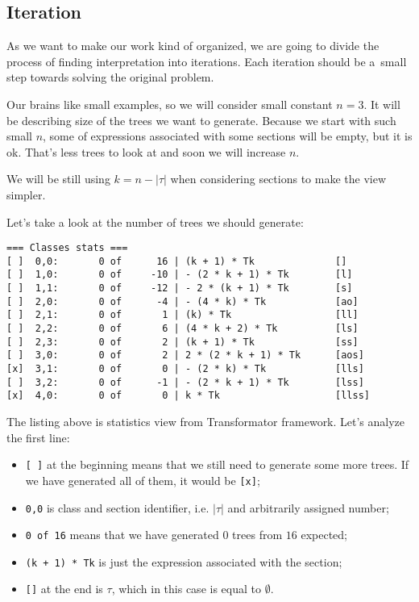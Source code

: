 \documentclass[final]{article}
\theoremstyle{definition}
\theoremstyle{definition}
\theoremstyle{remark}
\begin{document}
\subsection{Iteration}%
\label{sub:iteration}

As we want to make our work kind of organized, we are going to divide the process of finding interpretation into iterations. Each iteration should be a~small step towards solving the original problem.

Our brains like small examples, so we will consider small constant \(n = 3\). It will be describing size of the trees we want to generate. Because we start with such small \(n\), some of expressions associated with some sections will be empty, but it is ok. That's less trees to look at and soon we will increase \(n\).

We will be still using \(k = n - |\tau|\) when considering sections to make the view simpler.

Let's take a look at the number of trees we should generate:

\begin{lstlisting}
=== Classes stats ===
[ ]  0,0:       0 of      16 | (k + 1) * Tk              []
[ ]  1,0:       0 of     -10 | - (2 * k + 1) * Tk        [l]
[ ]  1,1:       0 of     -12 | - 2 * (k + 1) * Tk        [s]
[ ]  2,0:       0 of      -4 | - (4 * k) * Tk            [ao]
[ ]  2,1:       0 of       1 | (k) * Tk                  [ll]
[ ]  2,2:       0 of       6 | (4 * k + 2) * Tk          [ls]
[ ]  2,3:       0 of       2 | (k + 1) * Tk              [ss]
[ ]  3,0:       0 of       2 | 2 * (2 * k + 1) * Tk      [aos]
[x]  3,1:       0 of       0 | - (2 * k) * Tk            [lls]
[ ]  3,2:       0 of      -1 | - (2 * k + 1) * Tk        [lss]
[x]  4,0:       0 of       0 | k * Tk                    [llss]
\end{lstlisting}

The listing above is statistics view from Transformator framework. Let's analyze the first line:
\begin{itemize}
    \item \verb|[ ]| at the beginning means that we still need to generate some more trees. If we have generated all of them, it would be \verb|[x]|;
    \item \verb|0,0| is class and section identifier, i.e. \(|\tau|\) and arbitrarily assigned number;
    \item \verb|0 of 16| means that we have generated \(0\) trees from \(16\) expected;
    \item \verb|(k + 1) * Tk| is just the expression associated with the section;
    \item \verb|[]| at the end is \(\tau\), which in this case is equal to \(\emptyset\).
\end{itemize}
\end{document}
